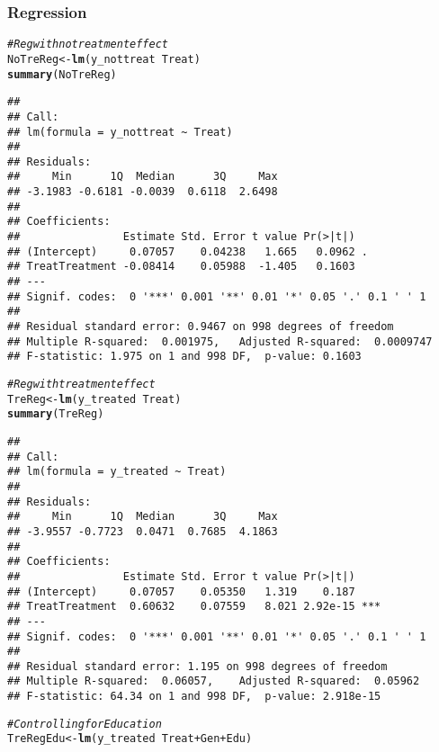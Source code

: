 \documentclass[11pt, a4paper]{article}\usepackage[]{graphicx}\usepackage[]{color}
\makeatletter
\newcommand{\hlcom}[1]{\textcolor[rgb]{0.678,0.584,0.686}{\textit{#1}}}%
\newcommand{\hlopt}[1]{\textcolor[rgb]{0,0,0}{#1}}%
\newcommand{\hlstd}[1]{\textcolor[rgb]{0.345,0.345,0.345}{#1}}%
\newcommand{\hlkwb}[1]{\textcolor[rgb]{0.69,0.353,0.396}{#1}}%
\newcommand{\hlkwd}[1]{\textcolor[rgb]{0.737,0.353,0.396}{\textbf{#1}}}%
\newenvironment{kframe}{%
 \def\at@end@of@kframe{}%
 \ifinner\ifhmode%
  \def\at@end@of@kframe{\end{minipage}}%
  \begin{minipage}{\columnwidth}%
 \fi\fi%
 \def\FrameCommand##1{\hskip\@totalleftmargin \hskip-\fboxsep
 \colorbox{shadecolor}{##1}\hskip-\fboxsep
     \hskip-\linewidth \hskip-\@totalleftmargin \hskip\columnwidth}%
 \MakeFramed {\advance\hsize-\width
   \@totalleftmargin\z@ \linewidth\hsize
   \@setminipage}}%
 {\par\unskip\endMakeFramed%
 \at@end@of@kframe}
\newenvironment{knitrout}{}{} %
\makeatother
\begin{document}
\clearpage

    \subsubsection{Regression}

\begin{knitrout}
\color{fgcolor}\begin{kframe}
\begin{alltt}
  \hlcom{#Reg with no treatment effect}
  \hlstd{NoTreReg} \hlkwb{<-} \hlkwd{lm}\hlstd{(y_nottreat} \hlopt{~} \hlstd{Treat)}
  \hlkwd{summary}\hlstd{(NoTreReg)}
\end{alltt}
\begin{verbatim}
## 
## Call:
## lm(formula = y_nottreat ~ Treat)
## 
## Residuals:
##     Min      1Q  Median      3Q     Max 
## -3.1983 -0.6181 -0.0039  0.6118  2.6498 
## 
## Coefficients:
##                Estimate Std. Error t value Pr(>|t|)  
## (Intercept)     0.07057    0.04238   1.665   0.0962 .
## TreatTreatment -0.08414    0.05988  -1.405   0.1603  
## ---
## Signif. codes:  0 '***' 0.001 '**' 0.01 '*' 0.05 '.' 0.1 ' ' 1
## 
## Residual standard error: 0.9467 on 998 degrees of freedom
## Multiple R-squared:  0.001975,	Adjusted R-squared:  0.0009747 
## F-statistic: 1.975 on 1 and 998 DF,  p-value: 0.1603
\end{verbatim}
\begin{alltt}
  \hlcom{#Reg with treatment effect}
  \hlstd{TreReg} \hlkwb{<-} \hlkwd{lm}\hlstd{(y_treated} \hlopt{~} \hlstd{Treat)}
  \hlkwd{summary}\hlstd{(TreReg)}
\end{alltt}
\begin{verbatim}
## 
## Call:
## lm(formula = y_treated ~ Treat)
## 
## Residuals:
##     Min      1Q  Median      3Q     Max 
## -3.9557 -0.7723  0.0471  0.7685  4.1863 
## 
## Coefficients:
##                Estimate Std. Error t value Pr(>|t|)    
## (Intercept)     0.07057    0.05350   1.319    0.187    
## TreatTreatment  0.60632    0.07559   8.021 2.92e-15 ***
## ---
## Signif. codes:  0 '***' 0.001 '**' 0.01 '*' 0.05 '.' 0.1 ' ' 1
## 
## Residual standard error: 1.195 on 998 degrees of freedom
## Multiple R-squared:  0.06057,	Adjusted R-squared:  0.05962 
## F-statistic: 64.34 on 1 and 998 DF,  p-value: 2.918e-15
\end{verbatim}
\begin{alltt}
  \hlcom{#Controlling for Education}
  \hlstd{TreRegEdu} \hlkwb{<-} \hlkwd{lm}\hlstd{(y_treated} \hlopt{~} \hlstd{Treat} \hlopt{+} \hlstd{Gen} \hlopt{+} \hlstd{Edu)}

\end{alltt}
\end{kframe}
\end{knitrout}
\end{document}
